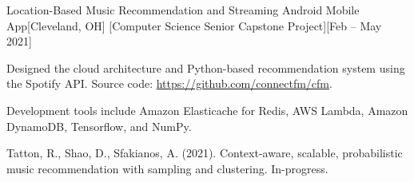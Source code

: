 \begin{ritemize}
{Location-Based Music Recommendation and Streaming Android Mobile App}[Cleveland, OH]
[Computer Science Senior Capstone Project][Feb -- May 2021]
	\item Designed the cloud architecture and Python-based recommendation system using the Spotify API. Source code: \url{https://github.com/connectfm/cfm}.
	\item Development tools include Amazon Elasticache for Redis, AWS Lambda, Amazon DynamoDB, Tensorflow, and NumPy.
	\item Tatton, R., Shao, D., Sfakianos, A. (2021). Context-aware, scalable, probabilistic music recommendation with sampling and clustering. In-progress.
\end{ritemize}